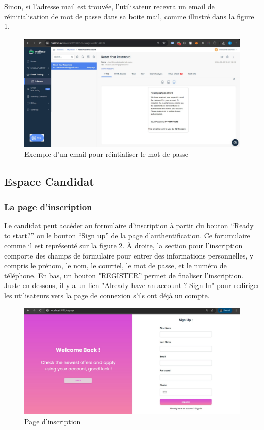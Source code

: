 Sinon, si l'adresse mail est trouvée, l'utilisateur recevra
un email de réinitialisation de mot de passe dans sa boite mail, comme illustré dans la figure \ref{fig:mailPass}.

\begin{figure}[htbp]
   \centering
   \includegraphics[scale=0.4]{screens/mailForgot.png} 
   \caption{Exemple d'un email pour réintialiser le mot de passe}
   \label{fig:mailPass}
\end{figure}

\subsection{Espace Candidat}
\subsubsection{La page d’inscription}
Le candidat peut accéder au formulaire d’inscription à partir du bouton 
“Ready to start?” ou le bouton “Sign up” de la page d’authentification. 
Ce forumulaire comme il est représenté sur la figure \ref{fig:singup}. 
À droite, la section pour l'inscription comporte des champs de 
formulaire pour entrer des informations personnelles, 
y compris le prénom, le nom, le courriel, le mot de  passe, et  
le numéro de téléphone. En bas, un bouton "REGISTER” permet de finaliser 
l'inscription. Juste en dessous, il y a un lien "Already have an account ? Sign In" 
pour rediriger les utilisateurs vers la page de connexion s’ils ont déjà 
un compte.

\begin{figure}[htbp]
   \centering
   \includegraphics[scale=0.5]{screens/signup.jpg} 
   \caption{Page d'inscription}
   \label{fig:singup}
\end{figure}

